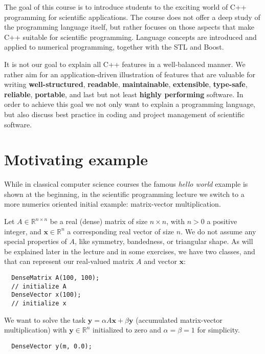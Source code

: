 The goal of this course is to introduce students to the exciting world of C++ programming for scientific applications. The course
does not offer a deep study of the programming language itself, but rather focuses on those aspects that make C++ suitable for
scientific programming. Language concepts are introduced and applied to numerical programming, together with the STL and Boost.

It is not our goal to explain all C++ features in a well-balanced manner. We rather aim for an application-driven illustration of
features that are valuable for writing \textbf{well-structured}, \textbf{readable}, \textbf{maintainable}, \textbf{extensible},
\textbf{type-safe}, \textbf{reliable}, \textbf{portable}, and last but not least \textbf{highly performing} software. In order
to achieve this goal we not only want to explain a programming language, but also discuss best practice in coding and project
management of scientific software.

\section{Motivating example}
While in classical computer science courses the famous \emph{hello world} example is shown at the beginning, in the scientific
programming lecture we switch to a more numerics oriented initial example: matrix-vector multiplication.

Let $A\in\mathbb{R}^{n\times n}$ be a real (dense) matrix of size $n\times n$, with $n > 0$ a positive integer, and $\mathbf{x}\in\mathbb{R}^n$
a corresponding real vector of size $n$. We do not assume any special properties of $A$, like symmetry, bandedness, or triangular
shape. As will be explained later in the lecture and in some exercises, we have two classes,  and 
that can represent our real-valued matrix $A$ and vector $\mathbf{x}$:
%
\begin{verbatim}
  DenseMatrix A(100, 100);
  // initialize A
  DenseVector x(100);
  // initialize x
\end{verbatim}

We want to solve the task $\mathbf{y} = \alpha A\mathbf{x} + \beta \mathbf{y}$ (accumulated matrix-vector multiplication) with $\mathbf{y}\in\mathbb{R}^n$ initialized to zero
and $\alpha=\beta=1$ for simplicity.
%
\begin{verbatim}
  DenseVector y(m, 0.0);
\end{verbatim}

